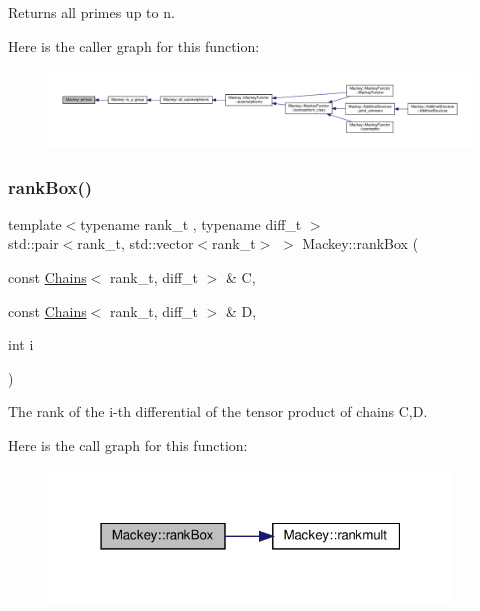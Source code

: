 Returns all primes up to n. 

Here is the caller graph for this function\+:\nopagebreak
\begin{figure}[H]
\begin{center}
\leavevmode
\includegraphics[width=350pt]{namespaceMackey_aa136aece9117704b3e5180d92484ed10_icgraph}
\end{center}
\end{figure}
\mbox{\label{namespaceMackey_a1257ce64369e72438023fd4e261c7c83}} 
\subsubsection{\texorpdfstring{rank\+Box()}{rankBox()}}
{\footnotesize\ttfamily template$<$typename rank\+\_\+t , typename diff\+\_\+t $>$ \\
std\+::pair$<$rank\+\_\+t, std\+::vector$<$rank\+\_\+t$>$ $>$ Mackey\+::rank\+Box (\begin{DoxyParamCaption}\item[{const \hyperlink{classMackey_1_1Chains}{Chains}$<$ rank\+\_\+t, diff\+\_\+t $>$ \&}]{C,  }\item[{const \hyperlink{classMackey_1_1Chains}{Chains}$<$ rank\+\_\+t, diff\+\_\+t $>$ \&}]{D,  }\item[{int}]{i }\end{DoxyParamCaption})}



The rank of the i-\/th differential of the tensor product of chains C,D. 

Here is the call graph for this function\+:\nopagebreak
\begin{figure}[H]
\begin{center}
\leavevmode
\includegraphics[width=304pt]{namespaceMackey_a1257ce64369e72438023fd4e261c7c83_cgraph}
\end{center}
\end{figure}
\mbox{\label{namespaceMackey_aaa0ce7673970bf261628768fb11a1995}} 
